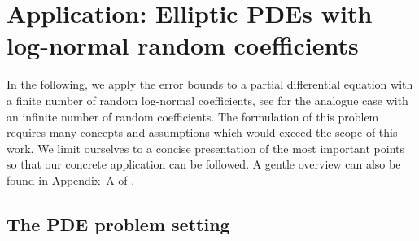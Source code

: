 \documentclass[namedate,webpdf,imanum]{ima-authoring-arxiv}%
\theoremstyle{thmstyletwo}%
\numberwithin{equation}{section}
\begin{document}
\section{Application: Elliptic PDEs with log-normal random coefficients}\label{sec:Appl}



In the following, we apply the error bounds to a partial differential equation with a finite number of random log-normal coefficients, see \cite{GKNSSS15} for the analogue case with an infinite number of random coefficients. The formulation of this problem requires many concepts and assumptions which would exceed the scope of this work. We limit ourselves to a concise presentation of the most important points so that our concrete application can be followed. A gentle overview can also be found in Appendix~A of \cite{DKP22}.

\subsection{The PDE problem setting}
\end{document}
